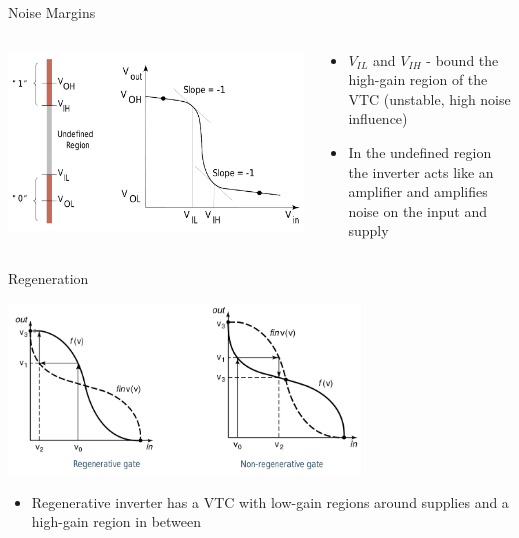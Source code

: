 \documentclass[12pt,aspectratio=169]{beamer}
\begin{document}
\begin{frame}{Noise Margins}
  \begin{columns}
    \begin{column}{0.5\textwidth}
      \begin{center}
        \includegraphics[width=\textwidth]{vtc_annotated.png}
      \end{center}
    \end{column}
    \begin{column}{0.5\textwidth}
      \begin{itemize}
        \setlength\itemsep{0.75em}
        \item $V_{IL}$ and $V_{IH}$ - bound the high-gain region of the VTC (unstable, high noise influence)
        \item In the undefined region the inverter acts like an amplifier and amplifies noise on the input and supply
      \end{itemize}
    \end{column}
  \end{columns}
\end{frame}

\begin{frame}{Regeneration}
  \begin{center}
    \includegraphics[width=0.7\textwidth]{regen.png}
  \end{center}
  \begin{itemize}
    \item Regenerative inverter has a VTC with low-gain regions around supplies and a high-gain region in between
  \end{itemize}
\end{frame}
\end{document}
